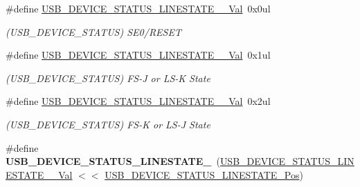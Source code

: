 \begin{DoxyCompactItemize}
\item 
\hypertarget{group___s_a_m_l21___u_s_b_ga6bb81d63d6025c58fd88e81a5522be60}{}\#define \hyperlink{group___s_a_m_l21___u_s_b_ga6bb81d63d6025c58fd88e81a5522be60}{U\+S\+B\+\_\+\+D\+E\+V\+I\+C\+E\+\_\+\+S\+T\+A\+T\+U\+S\+\_\+\+L\+I\+N\+E\+S\+T\+A\+T\+E\+\_\+\_\+\+Val}~0x0ul\label{group___s_a_m_l21___u_s_b_ga6bb81d63d6025c58fd88e81a5522be60}

\begin{DoxyCompactList}\small\item\em (U\+S\+B\+\_\+\+D\+E\+V\+I\+C\+E\+\_\+\+S\+T\+A\+T\+U\+S) S\+E0/\+R\+E\+S\+E\+T \end{DoxyCompactList}\item 
\hypertarget{group___s_a_m_l21___u_s_b_ga9be5dcded3e3389526af7731a279e9a7}{}\#define \hyperlink{group___s_a_m_l21___u_s_b_ga9be5dcded3e3389526af7731a279e9a7}{U\+S\+B\+\_\+\+D\+E\+V\+I\+C\+E\+\_\+\+S\+T\+A\+T\+U\+S\+\_\+\+L\+I\+N\+E\+S\+T\+A\+T\+E\+\_\+\_\+\+Val}~0x1ul\label{group___s_a_m_l21___u_s_b_ga9be5dcded3e3389526af7731a279e9a7}

\begin{DoxyCompactList}\small\item\em (U\+S\+B\+\_\+\+D\+E\+V\+I\+C\+E\+\_\+\+S\+T\+A\+T\+U\+S) F\+S-\/\+J or L\+S-\/\+K State \end{DoxyCompactList}\item 
\hypertarget{group___s_a_m_l21___u_s_b_gaff76a55f7d0040b772b73bc0164b9717}{}\#define \hyperlink{group___s_a_m_l21___u_s_b_gaff76a55f7d0040b772b73bc0164b9717}{U\+S\+B\+\_\+\+D\+E\+V\+I\+C\+E\+\_\+\+S\+T\+A\+T\+U\+S\+\_\+\+L\+I\+N\+E\+S\+T\+A\+T\+E\+\_\+\_\+\+Val}~0x2ul\label{group___s_a_m_l21___u_s_b_gaff76a55f7d0040b772b73bc0164b9717}

\begin{DoxyCompactList}\small\item\em (U\+S\+B\+\_\+\+D\+E\+V\+I\+C\+E\+\_\+\+S\+T\+A\+T\+U\+S) F\+S-\/\+K or L\+S-\/\+J State \end{DoxyCompactList}\item 
\hypertarget{group___s_a_m_l21___u_s_b_ga4d4cdebaf2c14eb7ec9941b21f86d5ea}{}\#define {\bfseries U\+S\+B\+\_\+\+D\+E\+V\+I\+C\+E\+\_\+\+S\+T\+A\+T\+U\+S\+\_\+\+L\+I\+N\+E\+S\+T\+A\+T\+E\+\_}~(\hyperlink{group___s_a_m_l21___u_s_b_ga6bb81d63d6025c58fd88e81a5522be60}{U\+S\+B\+\_\+\+D\+E\+V\+I\+C\+E\+\_\+\+S\+T\+A\+T\+U\+S\+\_\+\+L\+I\+N\+E\+S\+T\+A\+T\+E\+\_\+\_\+\+Val} $<$$<$ \hyperlink{group___s_a_m_l21___u_s_b_ga8e62dd599a4f4a34806c7677b9eaec13}{U\+S\+B\+\_\+\+D\+E\+V\+I\+C\+E\+\_\+\+S\+T\+A\+T\+U\+S\+\_\+\+L\+I\+N\+E\+S\+T\+A\+T\+E\+\_\+\+Pos})\label{group___s_a_m_l21___u_s_b_ga4d4cdebaf2c14eb7ec9941b21f86d5ea}


\end{DoxyCompactItemize}
